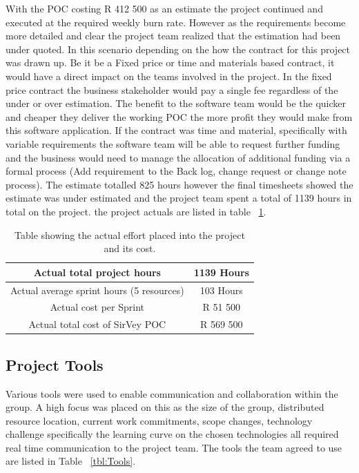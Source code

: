 \documentclass[12pt]{witseiepaper}
\begin{document}
With the POC costing R 412 500 as an estimate the project continued and executed at the required weekly burn rate. However as the requirements become more detailed and clear the project team realized that the estimation had been under quoted. In this scenario depending on the how the contract for this project was drawn up. Be it be a Fixed price or time and materials based contract, it would have a direct impact on the teams involved in the project. In the fixed price contract the business stakeholder would pay a single fee regardless of the under or over estimation. The benefit to the software team would be the quicker and cheaper they deliver the working POC the more profit they would make from this software application. If the contract was time and material, specifically with variable requirements the software team will be able to request further funding and the business would need to manage the allocation of additional funding via a formal process (Add requirement to the Back log, change request or change note process). The estimate totalled 825 hours however the final timesheets showed the estimate was under estimated and the project team spent a total of 1139 hours in total on the project. the project actuals are listed in table ~\ref{tbl:Actual}.

\begin{table}[htb] \caption{Table showing the actual effort placed into the project and its cost.} \label{tbl:Actual} 
	\begin{center}
		\begin{tabular}
			{|c|c|} %
			\hline Actual total project hours & 1139 Hours\\
			\hline Actual average sprint hours (5 resources) & 103 Hours\\
			\hline Actual cost per Sprint & R 51 500\\
			\hline Actual total cost of SirVey POC & R 569 500 \\
			\hline 
		\end{tabular}
	\end{center}
\end{table}


\subsection{Project Tools}
Various tools were used to enable communication and collaboration within the
group. A high focus was placed on this as the size of the group, distributed resource location, current work commitments, scope changes, technology challenge specifically the learning curve on the chosen technologies all required real time communication to the project team. The tools the team agreed to use are listed in Table ~\ref{tbl:Tools}.
\end{document}

